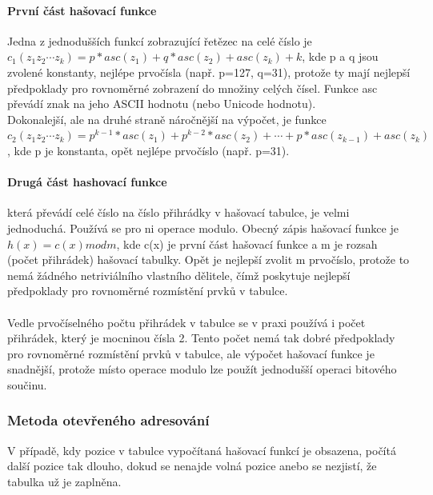 \documentclass[10pt,a4paper]{article}
\begin{document}
\paragraph{První část hašovací funkce}
Jedna z jednodušších funkcí zobrazující řetězec na celé číslo je $c_1 ( z_1 z_2 \cdots z_k ) = p \ast asc ( z_1 ) + q \ast asc ( z_2 ) + asc ( z_k ) + k$, kde p a q jsou zvolené konstanty, nejlépe prvočísla (např. p=127, q=31), protože ty mají nejlepší předpoklady pro rovnoměrné zobrazení do množiny celých čísel. Funkce asc převádí znak na jeho ASCII hodnotu (nebo Unicode hodnotu). \\
Dokonalejší, ale na druhé straně náročnější na výpočet, je funkce $c_2 ( z_1 z_2 \cdots z_k ) = p^{k-1} \ast asc ( z_1 ) + p^{k-2} \ast asc ( z_2 ) + \cdots + p \ast asc ( z_{k-1} ) + asc ( z_k )$, kde p je konstanta, opět nejlépe prvočíslo (např. p=31).
\paragraph{Drugá část hashovací funkce}
která převádí celé číslo na číslo přihrádky v hašovací tabulce, je velmi jednoduchá. Používá se pro ni operace modulo. Obecný zápis hašovací funkce je $h ( x ) = c ( x ) mod m$, kde c(x) je první část hašovací funkce a m je rozsah (počet přihrádek) hašovací tabulky. Opět je nejlepší zvolit m prvočíslo, protože to nemá žádného netriviálního vlastního dělitele, čímž poskytuje nejlepší předpoklady pro rovnoměrné rozmístění prvků v tabulce. \\ \\
Vedle prvočíselného počtu přihrádek v tabulce se v praxi používá i počet přihrádek, který je mocninou čísla 2. Tento počet nemá tak dobré předpoklady pro rovnoměrné rozmístění prvků v tabulce, ale výpočet hašovací funkce je snadnější, protože místo operace modulo lze použít jednodušší operaci bitového součinu.
\subsubsection{Metoda otevřeného adresování}
V případě, kdy pozice v tabulce vypočítaná hašovací funkcí je obsazena, počítá další pozice tak dlouho, dokud se nenajde volná pozice anebo se nezjistí, že tabulka už je zaplněna.
\end{document}
